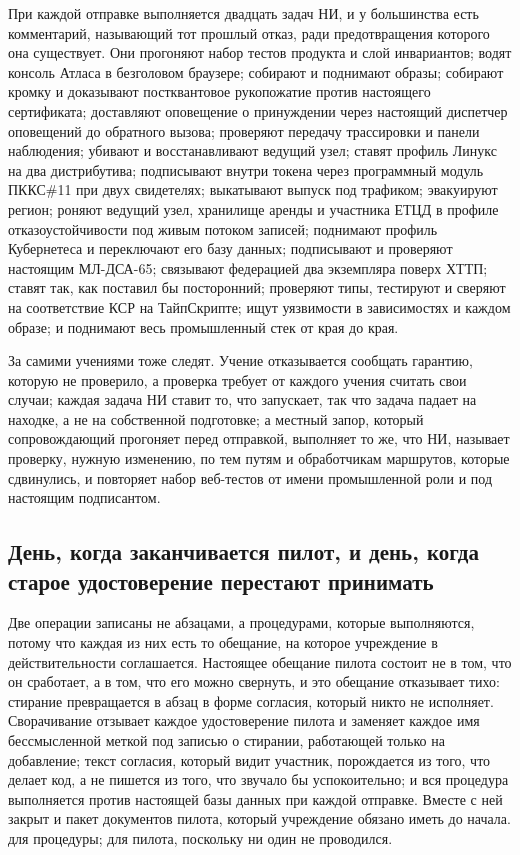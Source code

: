 При каждой отправке выполняется двадцать задач НИ, и у большинства есть комментарий, называющий
тот прошлый отказ, ради предотвращения которого она существует. Они прогоняют набор тестов
продукта и слой инвариантов; водят консоль Атласа в безголовом браузере; собирают и поднимают
образы; собирают кромку и доказывают постквантовое рукопожатие против настоящего сертификата;
доставляют оповещение о принуждении через настоящий диспетчер оповещений до обратного вызова;
проверяют передачу трассировки и панели наблюдения; убивают и восстанавливают ведущий узел;
ставят профиль Линукс на два дистрибутива; подписывают внутри токена через программный модуль
ПККС\#11 при двух свидетелях; выкатывают выпуск под трафиком; эвакуируют регион; роняют ведущий
узел, хранилище аренды и участника ЕТЦД в профиле отказоустойчивости под живым потоком записей;
поднимают профиль Кубернетеса и переключают его базу данных; подписывают и проверяют настоящим
МЛ-ДСА-65; связывают федерацией два экземпляра поверх ХТТП; ставят  так,
как поставил бы посторонний; проверяют типы, тестируют и сверяют на соответствие КСР на
ТайпСкрипте; ищут уязвимости в зависимостях и каждом образе; и поднимают весь промышленный стек
от края до края. \sImpl

За самими учениями тоже следят. Учение отказывается сообщать гарантию, которую не проверило, а
проверка требует от каждого учения считать свои случаи; каждая задача НИ ставит то, что запускает, так
что задача падает на находке, а не на собственной подготовке; а местный запор, который сопровождающий
прогоняет перед отправкой, выполняет то же, что НИ, называет проверку, нужную изменению, по тем путям и
обработчикам маршрутов, которые сдвинулись, и повторяет набор веб-тестов от имени промышленной роли и
под настоящим подписантом. \sImpl

\subsection{День, когда заканчивается пилот, и день, когда старое удостоверение перестают принимать}

Две операции записаны не абзацами, а процедурами, которые выполняются, потому что каждая из них
есть то обещание, на которое учреждение в действительности соглашается. Настоящее обещание пилота
состоит не в том, что он сработает, а в том, что его можно свернуть, и это обещание отказывает
тихо: стирание превращается в абзац в форме согласия, который никто не исполняет. Сворачивание
отзывает каждое удостоверение пилота и заменяет каждое имя бессмысленной меткой под
записью о стирании, работающей только на добавление; текст согласия, который видит участник,
порождается из того, что делает код, а не пишется из того, что звучало бы успокоительно; и вся
процедура выполняется против настоящей базы данных при каждой отправке. Вместе с ней закрыт и
пакет документов пилота, который учреждение обязано иметь до начала. \sImplMark{} для процедуры;
\sExt{} для пилота, поскольку ни один не проводился.

